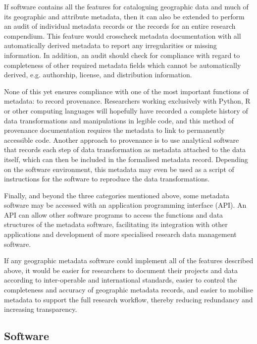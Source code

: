\documentclass{isprs} %
\begin{document}
If software contains all the features for cataloguing geographic data and much of its geographic and attribute metadata, then it can also be extended to perform an audit of individual metadata records or the records for an entire research compendium.
This feature would crosscheck metadata documentation with all automatically derived metadata to report any irregularities or missing information.
In addition, an audit should check for compliance with regard to completeness of other required metadata fields which cannot be automatically derived, e.g. authorship, license, and distribution information.

None of this yet ensures compliance with one of the most important functions of metadata: to record provenance.
Researchers working exclusively with Python, R or other computing languages will hopefully have recorded a complete history of data transformations and manipulations in legible code, and this method of provenance documentation requires the metadata to link to permanently accessible code.
Another approach to provenance is to use analytical software that records each step of data transformation as metadata attached to the data itself, which can then be included in the formalised metadata record.
Depending on the software environment, this metadata may even be used as a script of instructions for the software to reproduce the data transformations.

Finally, and beyond the three categories mentioned above, some metadata software may be accessed with an application programming interface (API).
An API can allow other software programs to access the functions and data structures of the metadata software, facilitating its integration with other applications and development of more specialised research data management software.

If any geographic metadata software could implement all of the features described above, it would be easier for researchers to document their projects and data according to inter-operable and international standards, easier to control the completeness and accuracy of geographic metadata records, and easier to mobilise metadata to support the full research workflow, thereby reducing redundancy and increasing transparency.

\subsection{Software}
\end{document}
